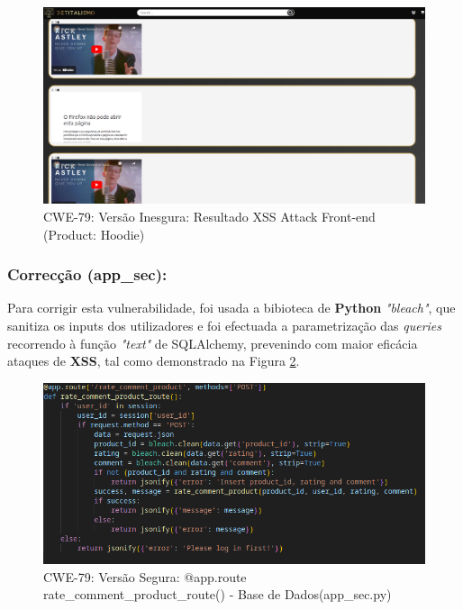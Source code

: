 \begin{figure}[H]
  \centering
  \includegraphics[width=16cm]{images/CWE-79-2.png}
  \caption{CWE-79: Versão Inesgura: Resultado XSS Attack Front-end (Product: Hoodie)}
  \label{fig:cwe79-JS1}
\end{figure}

\subsubsection{Correcção (app\_sec):}

Para corrigir esta vulnerabilidade, foi usada a bibioteca de \textbf{Python} \textit{"bleach"}, que sanitiza os inputs dos utilizadores e foi efectuada a parametrização das \textit{queries} recorrendo à função \textit{"text"} de SQLAlchemy, prevenindo com maior eficácia ataques de \textbf{XSS}, tal como demonstrado na Figura \ref{fig:cwe79-rateProduct-Secure}.\\

\begin{figure}[H]
  \centering
  \includegraphics[width=16cm]{images/CWE79-rateProduct-Secure.png}
  \caption{CWE-79: Versão Segura: @app.route rate\_comment\_product\_route() - Base de Dados(app\_sec.py)}
  \label{fig:cwe79-rateProduct-Secure}
\end{figure}


